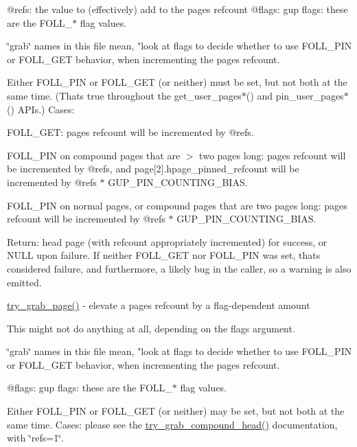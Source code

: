 @refs\+: the value to (effectively) add to the page\textquotesingle{}s refcount @flags\+: gup flags\+: these are the F\+O\+L\+L\+\_\+$\ast$ flag values.

\char`\"{}grab\char`\"{} names in this file mean, "look at flags to decide whether to use F\+O\+L\+L\+\_\+\+P\+IN or F\+O\+L\+L\+\_\+\+G\+ET behavior, when incrementing the page\textquotesingle{}s refcount.

Either F\+O\+L\+L\+\_\+\+P\+IN or F\+O\+L\+L\+\_\+\+G\+ET (or neither) must be set, but not both at the same time. (That\textquotesingle{}s true throughout the get\+\_\+user\+\_\+pages$\ast$() and pin\+\_\+user\+\_\+pages$\ast$() A\+P\+Is.) Cases\+:

F\+O\+L\+L\+\_\+\+G\+ET\+: page\textquotesingle{}s refcount will be incremented by @refs.

F\+O\+L\+L\+\_\+\+P\+IN on compound pages that are $>$ two pages long\+: page\textquotesingle{}s refcount will be incremented by @refs, and page\mbox{[}2\mbox{]}.hpage\+\_\+pinned\+\_\+refcount will be incremented by @refs $\ast$ G\+U\+P\+\_\+\+P\+I\+N\+\_\+\+C\+O\+U\+N\+T\+I\+N\+G\+\_\+\+B\+I\+AS.

F\+O\+L\+L\+\_\+\+P\+IN on normal pages, or compound pages that are two pages long\+: page\textquotesingle{}s refcount will be incremented by @refs $\ast$ G\+U\+P\+\_\+\+P\+I\+N\+\_\+\+C\+O\+U\+N\+T\+I\+N\+G\+\_\+\+B\+I\+AS.

Return\+: head page (with refcount appropriately incremented) for success, or N\+U\+LL upon failure. If neither F\+O\+L\+L\+\_\+\+G\+ET nor F\+O\+L\+L\+\_\+\+P\+IN was set, that\textquotesingle{}s considered failure, and furthermore, a likely bug in the caller, so a warning is also emitted.

\mbox{\hyperlink{gup_8c_ab3ae3c4d8680232fa24a82477a090012}{try\+\_\+grab\+\_\+page()}} -\/ elevate a page\textquotesingle{}s refcount by a flag-\/dependent amount

This might not do anything at all, depending on the flags argument.

\char`\"{}grab\char`\"{} names in this file mean, "look at flags to decide whether to use F\+O\+L\+L\+\_\+\+P\+IN or F\+O\+L\+L\+\_\+\+G\+ET behavior, when incrementing the page\textquotesingle{}s refcount.

@flags\+: gup flags\+: these are the F\+O\+L\+L\+\_\+$\ast$ flag values.

Either F\+O\+L\+L\+\_\+\+P\+IN or F\+O\+L\+L\+\_\+\+G\+ET (or neither) may be set, but not both at the same time. Cases\+: please see the \mbox{\hyperlink{gup_8c_aa4595a7163e71ca3648e5b04b50fc732}{try\+\_\+grab\+\_\+compound\+\_\+head()}} documentation, with \char`\"{}refs=1\char`\"{}.

